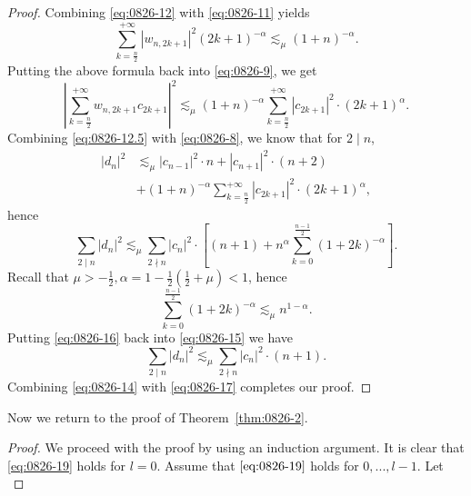 \documentclass[pdflatex,sn-aps]{sn-jnl}%
\theoremstyle{thmstyleone}%
\theoremstyle{thmstyletwo}%
\theoremstyle{thmstylethree}%
\begin{document}
\begin{appendices}
\begin{proof}
  Combining \eqref{eq:0826-12} with \eqref{eq:0826-11} yields
  \begin{displaymath}
    \sum_{k=\frac{n}{2}}^{+\infty}\left|w_{n, 2 k+1}\right|^2(2 k+1)^{-\alpha} \lesssim_\mu(1+n)^{-\alpha}.
  \end{displaymath}
  Putting the above formula back into \eqref{eq:0826-9}, we get
  \begin{equation}\label{eq:0826-12.5}
    \left|\sum_{k=\frac{n}{2}}^{+\infty} w_{n, 2 k+1} c_{2 k+1}\right|^2 \lesssim_\mu(1+n)^{-\alpha} \sum_{k=\frac{n}{2}}^{+\infty}\left|c_{2 k+1}\right|^2 \cdot(2 k+1)^\alpha.
  \end{equation}
  Combining \eqref{eq:0826-12.5} with \eqref{eq:0826-8}, we know that for $2 \mid n$,
  \begin{equation}\label{eq:0826-13}
    \begin{aligned}
    \left|d_n\right|^2 & \lesssim_\mu\left|c_{n-1}\right|^2 \cdot n+\left|c_{n+1}\right|^2 \cdot(n+2) \\
    & +(1+n)^{-\alpha} \sum_{k=\frac{n}{2}}^{+\infty}\left|c_{2 k+1}\right|^2 \cdot(2 k+1)^\alpha,
    \end{aligned}
  \end{equation}
  hence
  \begin{equation}\label{eq:0826-15}
    \sum_{2 \mid n}|d_n|^2 \lesssim_\mu \sum_{2 \nmid n}\left|c_n\right|^2 \cdot\left[(n+1)+n^\alpha \sum_{k=0}^{\frac{n-1}{2}}(1+2 k)^{-\alpha}\right].
  \end{equation}
  Recall that $\mu>-\frac{1}{2}, \alpha=1-\frac{1}{2}\left(\frac{1}{2}+\mu\right)<1$,
  hence
  \begin{equation}\label{eq:0826-16}
    \sum_{k=0}^{\frac{n-1}{2}}(1+2 k)^{-\alpha} \lesssim_\mu n^{1-\alpha}.
  \end{equation}
  Putting \eqref{eq:0826-16} back into \eqref{eq:0826-15} we have
  \begin{equation}\label{eq:0826-17}
    \sum_{2 \mid n}|d_n|^2 \lesssim_\mu \sum_{2 \nmid n}\left|c_n\right|^2 \cdot(n+1).
  \end{equation}
  Combining \eqref{eq:0826-14} with \eqref{eq:0826-17} completes our proof.
\end{proof}
Now we return to the proof of Theorem~\ref{thm:0826-2}.
\begin{proof}
  We proceed with the proof by using an induction argument.
  It is clear that \eqref{eq:0826-19} holds for $l = 0$.
  Assume that $\eqref{eq:0826-19}$ holds for $0,...,l-1$. Let
  \begin{equation}\label{eq:0826-20}

\end{equation}
\end{proof}
\end{appendices}
\end{document}
